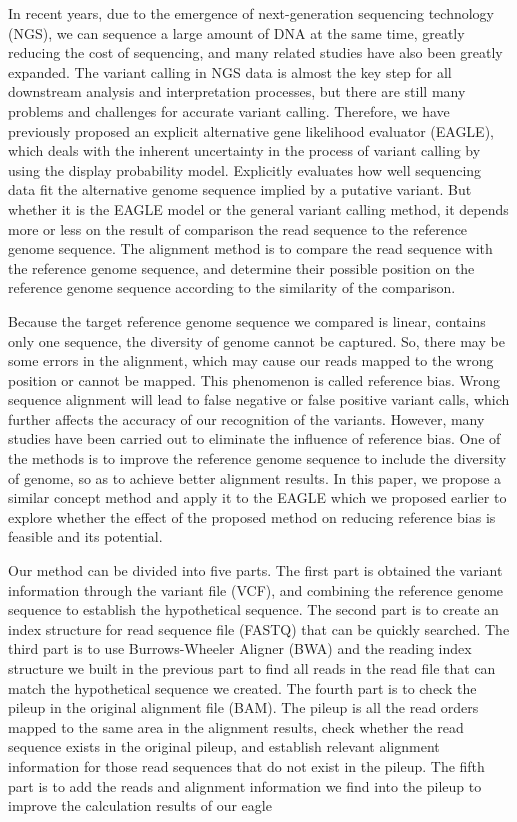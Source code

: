 In recent years, due to the emergence of next-generation sequencing technology (NGS), we can sequence a large amount of DNA at the same time, greatly reducing the cost of sequencing, and many related studies have also been greatly expanded. The variant calling in NGS data is almost the key step for all downstream analysis and interpretation processes, but there are still many problems and challenges for accurate variant calling. Therefore, we have previously proposed an explicit alternative gene likelihood evaluator (EAGLE), which deals with the inherent uncertainty in the process of variant calling by using the display probability model. Explicitly evaluates how well sequencing data fit the alternative genome sequence implied by a putative variant. But whether it is the EAGLE model or the general variant calling method, it depends more or less on the result of comparison the read sequence to the reference genome sequence. The alignment method is to compare the read sequence with the reference genome sequence, and determine their possible position on the reference genome sequence according to the similarity of the comparison.

Because the target reference genome sequence we compared is linear, contains only one sequence, the diversity of genome cannot be captured. So, there may be some errors in the alignment, which may cause our reads mapped to the wrong position or cannot be mapped. This phenomenon is called reference bias. Wrong sequence alignment will lead to false negative or false positive variant calls, which further affects the accuracy of our recognition of the variants. However, many studies have been carried out to eliminate the influence of reference bias. One of the methods is to improve the reference genome sequence to include the diversity of genome, so as to achieve better alignment results. In this paper, we propose a similar concept method and apply it to the EAGLE which we proposed earlier to explore whether the effect of the proposed method on reducing reference bias is feasible and its potential.

Our method can be divided into five parts. The first part is obtained the variant information through the variant file (VCF), and combining the reference genome sequence to establish the hypothetical sequence. The second part is to create an index structure for read sequence file (FASTQ) that can be quickly searched. The third part is to use Burrows-Wheeler Aligner (BWA) and the reading index structure we built in the previous part to find all reads in the read file that can match the hypothetical sequence we created. The fourth part is to check the pileup in the original alignment file (BAM). The pileup is all the read orders mapped to the same area in the alignment results, check whether the read sequence exists in the original pileup, and establish relevant alignment information for those read sequences that do not exist in the pileup. The fifth part is to add the reads and alignment information we find into the pileup to improve the calculation results of our eagle

